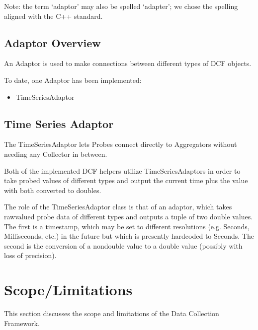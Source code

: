 \documentclass[letterpaper,10pt,english]{sphinxmanual}
\begin{document}
Note:  the term ‘adaptor’ may also be spelled ‘adapter’; we chose
the spelling aligned with the C++ standard.


\subsection{Adaptor Overview}
\label{\detokenize{adaptor:adaptor-overview}}
An Adaptor is used to make connections between different types of DCF
objects.

To date, one Adaptor has been implemented:
\begin{itemize}
\item {} 
TimeSeriesAdaptor

\end{itemize}


\subsection{Time Series Adaptor}
\label{\detokenize{adaptor:time-series-adaptor}}
The TimeSeriesAdaptor lets Probes connect directly to Aggregators
without needing any Collector in between.

Both of the implemented DCF helpers utilize TimeSeriesAdaptors
in order to take probed values of different types and output the
current time plus the value with both converted to doubles.

The role of the TimeSeriesAdaptor class is that of an adaptor, which
takes raw\sphinxhyphen{}valued probe data of different types and outputs a tuple of
two double values.  The first is a timestamp, which may be set to
different resolutions (e.g. Seconds, Milliseconds, etc.) in the future
but which is presently hardcoded to Seconds.
The second is the conversion of a non\sphinxhyphen{}double
value to a double value (possibly with loss of precision).


\section{Scope/Limitations}
\label{\detokenize{scope-and-limitations:scope-limitations}}\label{\detokenize{scope-and-limitations::doc}}
This section discusses the scope and limitations of the Data
Collection Framework.
\end{document}
